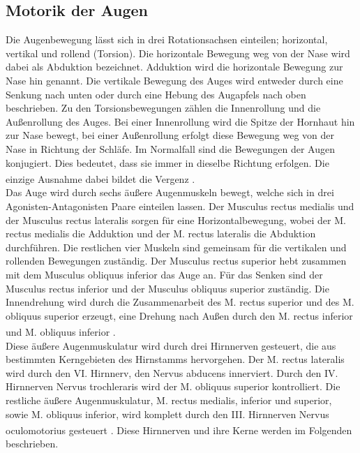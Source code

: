 \documentclass[12pt,a4paper,pdftex]{article}
\begin{document}
\subsection{Motorik der Augen} 
Die Augenbewegung lässt sich in drei Rotationsachsen einteilen; horizontal, vertikal und rollend (Torsion). Die horizontale Bewegung weg von der Nase wird dabei als Abduktion bezeichnet. Adduktion wird die horizontale Bewegung zur Nase hin genannt. Die vertikale Bewegung des Auges wird entweder durch eine Senkung nach unten oder durch eine Hebung des Augapfels nach oben beschrieben. Zu den Torsionsbewegungen zählen die Innenrollung und die Außenrollung des Auges. Bei einer Innenrollung wird die Spitze der Hornhaut hin zur Nase bewegt, bei einer Außenrollung erfolgt diese Bewegung weg von der Nase in Richtung der Schläfe. Im Normalfall sind die Bewegungen der Augen konjugiert. Dies bedeutet, dass sie immer in dieselbe Richtung erfolgen. Die einzige Ausnahme dabei bildet die Vergenz \textsuperscript{\cite[39]{kandel2013principles}}. \\
Das Auge wird durch sechs äußere Augenmuskeln bewegt, welche sich in drei Agonisten-Antagonisten Paare einteilen lassen. Der Musculus rectus medialis und der Musculus rectus lateralis sorgen für eine Horizontalbewegung, wobei der M. rectus medialis die Adduktion und der M. rectus lateralis die Abduktion durchführen. Die restlichen vier Muskeln sind gemeinsam für die vertikalen und rollenden Bewegungen zuständig. Der Musculus rectus superior hebt zusammen mit dem Musculus obliquus inferior das Auge an. Für das Senken sind der Musculus rectus inferior und der Musculus obliquus superior zuständig. Die Innendrehung wird durch die Zusammenarbeit des M. rectus superior und des M. obliquus superior erzeugt, eine Drehung nach Außen durch den M. rectus inferior und M. obliquus inferior \textsuperscript{\cite[39]{kandel2013principles}}. \\  
Diese äußere Augenmuskulatur wird durch drei Hirnnerven gesteuert, die aus bestimmten Kerngebieten des Hirnstamms hervorgehen. Der M. rectus lateralis wird durch den VI. Hirnnerv, den Nervus abducens innerviert. Durch den IV. Hirnnerven Nervus trochleraris wird der M. obliquus superior kontrolliert. Die restliche äußere Augenmuskulatur, M. rectus medialis, inferior und superior, sowie M. obliquus inferior, wird komplett durch den III. Hirnnerven Nervus oculomotorius gesteuert \textsuperscript{\cite[39]{kandel2013principles}}. Diese Hirnnerven und ihre Kerne werden im Folgenden beschrieben.   
\end{document}
